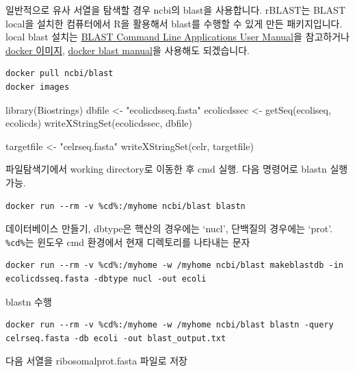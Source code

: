 \documentclass[
]{book}
\newenvironment{Shaded}{\begin{snugshade}}{\end{snugshade}}
\newcommand{\FunctionTok}[1]{\textcolor[rgb]{0.00,0.00,0.00}{#1}}
\newcommand{\NormalTok}[1]{#1}
\newcommand{\OtherTok}[1]{\textcolor[rgb]{0.56,0.35,0.01}{#1}}
\newcommand{\StringTok}[1]{\textcolor[rgb]{0.31,0.60,0.02}{#1}}
\begin{document}
일반적으로 유사 서열을 탐색할 경우 ncbi의 blast을 사용합니다. rBLAST는 BLAST local을 설치한 컴퓨터에서 R을 활용해서 blast를 수행할 수 있게 만든 패키지입니다. local blast 설치는 \href{https://www.ncbi.nlm.nih.gov/books/NBK279690/}{BLAST Command Line Applications User Manual}을 참고하거나 \href{https://hub.docker.com/r/ncbi/blast}{docker 이미지}, \href{https://github.com/ncbi/blast_plus_docs}{docker blast manual}을 사용해도 되겠습니다.

\begin{verbatim}
docker pull ncbi/blast
docker images
\end{verbatim}

\begin{Shaded}
\begin{Highlighting}[]
\FunctionTok{library}\NormalTok{(Biostrings)}
\NormalTok{dbfile }\OtherTok{\textless{}{-}} \StringTok{"ecolicdsseq.fasta"}
\NormalTok{ecolicdssec }\OtherTok{\textless{}{-}} \FunctionTok{getSeq}\NormalTok{(ecoliseq, ecolicds)}
\FunctionTok{writeXStringSet}\NormalTok{(ecolicdssec, dbfile)}

\NormalTok{targetfile }\OtherTok{\textless{}{-}} \StringTok{"celrseq.fasta"}
\FunctionTok{writeXStringSet}\NormalTok{(celr, targetfile)}
\end{Highlighting}
\end{Shaded}

파일탐색기에서 working directory로 이동한 후 cmd 실행. 다음 명령어로 blastn 실행 가능.

\begin{verbatim}
docker run --rm -v %cd%:/myhome ncbi/blast blastn 
\end{verbatim}

데이터베이스 만들기, dbtype은 핵산의 경우에는 `nucl', 단백질의 경우에는 `prot'. \texttt{\%cd\%}는 윈도우 cmd 환경에서 현재 디렉토리를 나타내는 문자

\begin{verbatim}
docker run --rm -v %cd%:/myhome -w /myhome ncbi/blast makeblastdb -in ecolicdsseq.fasta -dbtype nucl -out ecoli
\end{verbatim}

blastn 수행

\begin{verbatim}
docker run --rm -v %cd%:/myhome -w /myhome ncbi/blast blastn -query celrseq.fasta -db ecoli -out blast_output.txt
\end{verbatim}

다음 서열을 ribosomalprot.fasta 파일로 저장
\end{document}
